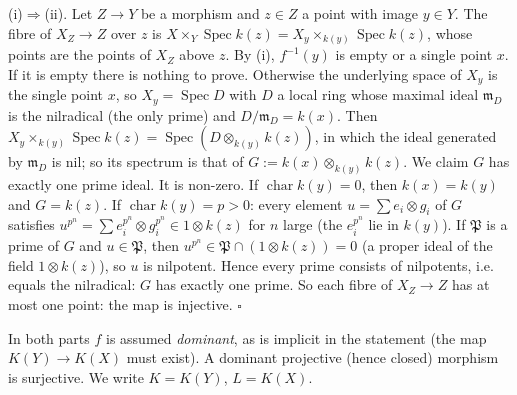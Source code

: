 \documentclass[11pt]{article}
\begin{document}
(i)$\Rightarrow$(ii). Let $Z\to Y$ be a morphism and $z\in Z$ a point with image $y\in Y$. The fibre of $X_Z\to Z$ over $z$ is $X\times_Y\operatorname{Spec}k(z)=X_y\times_{k(y)}\operatorname{Spec}k(z)$, whose points are the points of $X_Z$ above $z$. By (i), $f^{-1}(y)$ is empty or a single point $x$. If it is empty there is nothing to prove. Otherwise the underlying space of $X_y$ is the single point $x$, so $X_y=\operatorname{Spec}D$ with $D$ a local ring whose maximal ideal $\mathfrak m_D$ is the nilradical (the only prime) and $D/\mathfrak m_D=k(x)$. Then $X_y\times_{k(y)}\operatorname{Spec}k(z)=\operatorname{Spec}(D\otimes_{k(y)}k(z))$, in which the ideal generated by $\mathfrak m_D$ is nil; so its spectrum is that of $G:=k(x)\otimes_{k(y)}k(z)$. We claim $G$ has exactly one prime ideal. It is non-zero. If $\operatorname{char}k(y)=0$, then $k(x)=k(y)$ and $G=k(z)$. If $\operatorname{char}k(y)=p>0$: every element $u=\sum e_i\otimes g_i$ of $G$ satisfies $u^{p^n}=\sum e_i^{p^n}\otimes g_i^{p^n}\in1\otimes k(z)$ for $n$ large (the $e_i^{p^n}$ lie in $k(y)$). If $\mathfrak P$ is a prime of $G$ and $u\in\mathfrak P$, then $u^{p^n}\in\mathfrak P\cap(1\otimes k(z))=0$ (a proper ideal of the field $1\otimes k(z)$), so $u$ is nilpotent. Hence every prime consists of nilpotents, i.e. equals the nilradical: $G$ has exactly one prime. So each fibre of $X_Z\to Z$ has at most one point: the map is injective. \hfill$\square$

\pf
In both parts $f$ is assumed \emph{dominant}, as is implicit in the statement (the map $K(Y)\to K(X)$ must exist). A dominant projective (hence closed) morphism is surjective. We write $K=K(Y)$, $L=K(X)$.
\end{document}
